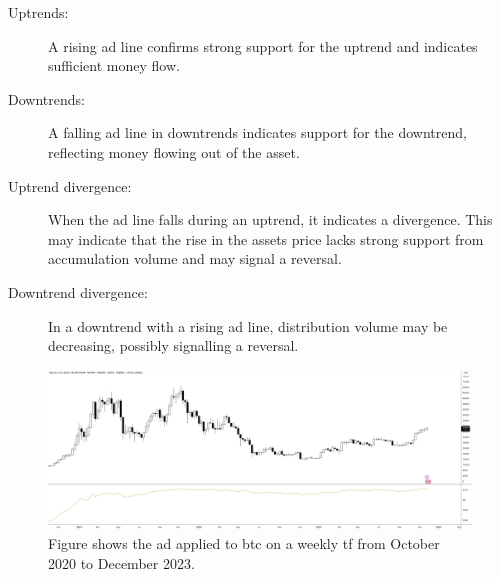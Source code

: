 \begin{description}
    \item[Uptrends:] A rising \gls{ad} line confirms strong support for the uptrend and indicates sufficient money flow.
    \item[Downtrends:] A falling \gls{ad} line in downtrends indicates support for the downtrend, reflecting money flowing out of the asset.
    \item[Uptrend divergence:] When the \gls{ad} line falls during an uptrend, it indicates a divergence. This may indicate that the rise in the assets price lacks strong support from accumulation volume and may signal a reversal.
    \item[Downtrend divergence:] In a downtrend with a rising \gls{ad} line, distribution volume may be decreasing, possibly signalling a reversal.
\end{description}

\begin{figure}[ht]
    \centering
    \includegraphics[width=\textwidth]{./assets/img/btc-ad.png}
    \caption{Figure shows the \gls{ad} applied to \gls{btc} on a weekly \gls{tf} from October 2020 to December 2023.}
    \label{fig:ad}
\end{figure}

